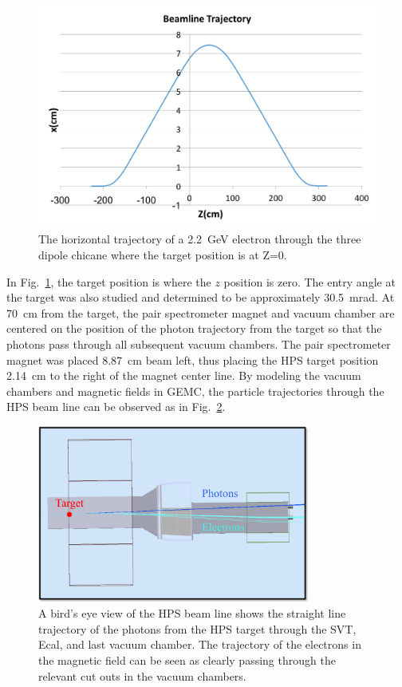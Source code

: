 \begin{figure}[H]
  \centering
      \includegraphics[width=1.0\textwidth]{pics/experiment/feetrajectory.png}
  \caption[Charged particle trajectory in HPS beamline]{The horizontal trajectory of a 2.2~GeV electron through the three dipole chicane where the target position is at Z=0.}
  \label{Figure:trajectory}
\end{figure}

In Fig.~\ref{Figure:trajectory}, the target position is where the $z$ position is zero. The entry angle at the target was also studied and determined to be approximately 30.5~mrad. At 70~cm from the target, the pair spectrometer magnet and vacuum chamber are centered on the position of the photon trajectory from the target so that the photons pass through all subsequent vacuum chambers. The pair spectrometer magnet was placed 8.87~cm beam left, thus placing the HPS target position 2.14~cm to the right of the magnet center line. By modeling the vacuum chambers and magnetic fields in GEMC, the particle trajectories through the HPS beam line can be observed as in Fig.~\ref{Figure:gemc}.

\begin{figure}[H]
  \centering
      \includegraphics[width=0.8\textwidth]{pics/experiment/beamlineGemc.png}
  \caption[HPS beamline simulation in GEMC]{A bird's eye view of the HPS beam line shows the straight line trajectory of the photons from the HPS target through the SVT, Ecal, and last vacuum chamber. The trajectory of the electrons in the magnetic field can be seen as clearly passing through the relevant cut outs in the vacuum chambers.}
  \label{Figure:gemc}
\end{figure}
 
